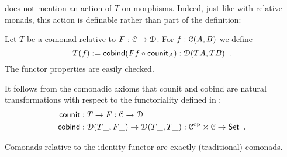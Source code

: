 \documentclass[a4paper,USenglish]{lipics}
\begin{document}
\begin{Long}
  does not mention an action of $T$ on morphisms. Indeed, just like with relative monads, this action is definable rather than part of the definition:
\begin{defn}%
\label{def:lift}
 Let $T$ be a  comonad relative to $F:\C\to\D$.
 For $f : \C(A,B)$ we define
  \[ T(f) := \cobind(\comp{\counit_A}{Ff}) : \D(TA,TB) \enspace .\] 
 The functor properties are easily checked.
\end{defn}

\begin{rem}
 It follows from the comonadic axioms that
 counit and cobind are natural transformations with respect to the functoriality defined in :
 \begin{align*}
     \counit &: T \to F : \C\to \D \\
     \cobind &: \D(T\_, F\_) \to \D(T\_, T\_) : \C^{\text{op}} \times \C \to \Ens \enspace .
 \end{align*}

\end{rem}


\end{Long}

\begin{Long}
Comonads relative to the identity functor are exactly (traditional) comonads.
\end{Long}
\end{document}
